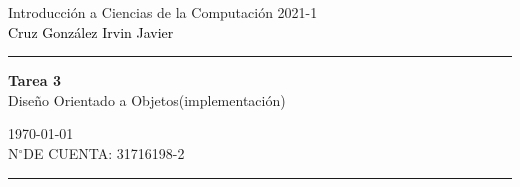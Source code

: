 \documentclass[a4paper,10pt]{article}
\begin{document}
\fancyhead[C]{}
\begin{minipage}{0.295\textwidth} 
\raggedright
Introducción a Ciencias de la Computación 2021-1\\    
\footnotesize 
\colorbox[rgb]{0.13, 0.67, 0.8}{\textcolor{black}{Cruz González Irvin Javier}}
\textcolor[rgb]{1.0, 0.44, 0.37}{\medskip\hrule}
\end{minipage}
\begin{minipage}{0.4\textwidth} 
\centering 
\large 
\textbf{Tarea 3}\\ 
\normalsize 
Diseño Orientado a Objetos(implementación)\\
\end{minipage}
\begin{minipage}{0.295\textwidth} 
\raggedleft
\today\\ 
\footnotesize
N$^{\circ}$DE CUENTA: 31716198-2
 \textcolor[rgb]{1.0, 0.44, 0.37}{\medskip\hrule}
\end{minipage}
\end{document}
